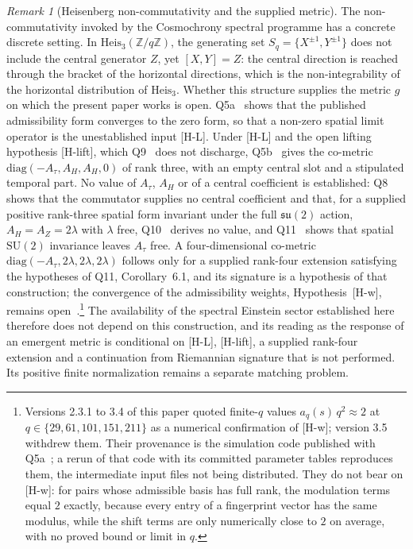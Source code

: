 \documentclass[pdflatex,sn-mathphys-num]{sn-jnl} %
\theoremstyle{remark}
\newtheorem*{remark}{Remark}
\theoremstyle{plain}
\begin{document}
    \begin{remark}[Heisenberg non-commutativity and the supplied metric]
    The non-commutativity invoked by the Cosmochrony spectral programme has a concrete discrete setting.
    In $\mathrm{Heis}_3(\mathbb{Z}/q\mathbb{Z})$, the generating set
    $S_q = \{X^{\pm 1}, Y^{\pm 1}\}$ does not include the central generator $Z$,
    yet $[X, Y] = Z$: the central direction is reached through the bracket of the horizontal directions, which is
    the non-integrability of the horizontal distribution of $\mathrm{Heis}_3$.
    Whether this structure supplies the metric $g$ on which the present paper works is open.
    Q5a~\cite{Beau2026q5a} shows that the published admissibility form converges to the zero form, so that a
    non-zero spatial limit operator is the unestablished input [H-L].
    Under [H-L] and the open lifting hypothesis [H-lift], which Q9~\cite{Beau2026q9} does not discharge,
    Q5b~\cite{Beau2026q5b} gives the co-metric $\mathrm{diag}(-A_\tau, A_H, A_H, 0)$ of rank three, with an empty
    central slot and a stipulated temporal part.
    No value of $A_\tau$, $A_H$ or of a central coefficient is established: Q8~\cite{BeauQ8} shows that the
    commutator supplies no central coefficient and that, for a supplied positive rank-three spatial form invariant
    under the full $\mathfrak{su}(2)$ action, $A_H = A_Z = 2\lambda$ with $\lambda$ free, Q10~\cite{Beau2026q10}
    derives no value, and Q11~\cite{Beau2026q11} shows that spatial $\mathrm{SU}(2)$ invariance leaves $A_\tau$
    free.
    A four-dimensional co-metric $\mathrm{diag}(-A_\tau, 2\lambda, 2\lambda, 2\lambda)$ follows only for a supplied
    rank-four extension satisfying the hypotheses of Q11, Corollary~6.1, and its signature is a hypothesis of that
    construction; the convergence of the admissibility weights, Hypothesis~[H-w], remains open~\cite{Beau2026w1}.\footnote{%
      Versions 2.3.1 to 3.4 of this paper quoted finite-$q$ values $a_q(s)\,q^2 \approx 2$ at
      $q \in \{29, 61, 101, 151, 211\}$ as a numerical confirmation of [H-w]; version 3.5 withdrew them.
      Their provenance is the simulation code published with Q5a~\cite{Beau2026q5a}; a rerun of that code with its
      committed parameter tables reproduces them, the intermediate input files not being distributed.
      They do not bear on [H-w]: for pairs whose admissible basis has full rank, the modulation terms equal $2$
      exactly, because every entry of a fingerprint vector has the same modulus, while the shift terms are only
      numerically close to $2$ on average, with no proved bound or limit in $q$.}
    The availability of the spectral Einstein sector established here therefore does not depend on this
    construction, and its reading as the response of an emergent metric is conditional on [H-L], [H-lift], a
    supplied rank-four extension and a continuation from Riemannian signature that is not performed.
    Its positive finite normalization remains a separate matching problem.
    \end{remark}
\end{document}
